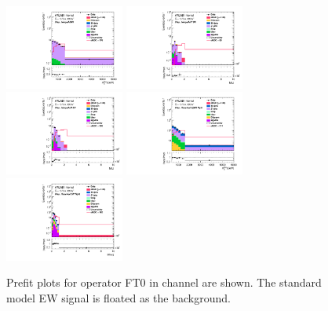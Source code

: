 \begin{figure}[ht]
    \centering
    	\includegraphics[width=0.35\textwidth]{figures/aQGC/Region_distMTagMerJets_DCRVjet_BMin0_J0_incJet1_L2_T0_incFat1_Y6051_incTag1_Fat1_Prefitlog.pdf}
    	\includegraphics[width=0.35\textwidth]{figures/aQGC/Region_distMllJ_DSRVBSHP_BMin0_J0_incJet1_L2_T0_incFat1_Y6051_incTag1_Fat1_Prefitlog.pdf}
    	\includegraphics[width=0.35\textwidth]{figures/aQGC/Region_distMllJ_DSRVBSLP_BMin0_J0_incJet1_L2_T0_incFat1_Y6051_incTag1_Fat1_Prefitlog.pdf}
    	\includegraphics[width=0.35\textwidth]{figures/aQGC/Region_distMTagJets_DCRVjetFid_BMin0_T0_Y6051_incTag1_J2_L0_incJet1_Prefitlog.pdf}
    	\includegraphics[width=0.35\textwidth]{figures/aQGC/Region_distMtvvjj_DSRVBSFid_BMin0_T0_Y6051_incTag1_J2_L0_incJet1_Prefitlog.pdf}
        \caption{Prefit plots for operator FT0 in \tlep channel are shown. The standard model EW signal is floated as the background.}
        \label{fig:2lepFT0}
\end{figure}


